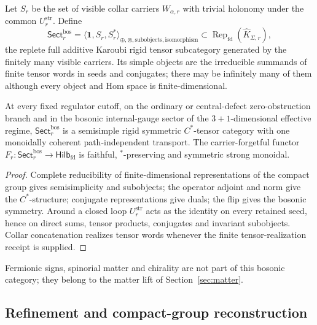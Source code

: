 \documentclass[11pt]{article}
\begin{document}
\begin{definition}
Let \(S_r\) be the set of visible collar carriers \(W_{\alpha,r}\) with trivial
holonomy under the common \(U^{\mathrm{str}}_r\). Define
\[
\mathsf{Sect}^{\mathrm{bos}}_r
=\bigl\langle\mathbf 1,S_r,S_r^*\bigr\rangle_{
\oplus,\otimes,\mathrm{subobjects},\mathrm{isomorphism}}
\subset\operatorname{Rep}_{\mathrm{fd}}(\widehat K_{\Sigma,r}),
\]
the replete full additive Karoubi rigid tensor subcategory generated by the
finitely many visible carriers. Its simple objects are the irreducible
summands of finite tensor words in seeds and conjugates; there may be
infinitely many of them although every object and Hom space is
finite-dimensional.
\end{definition}

\begin{theorem}
At every fixed regulator cutoff, on the ordinary or central-defect
zero-obstruction branch and in the bosonic internal-gauge sector of the
\(3+1\)-dimensional effective regime, \(\mathsf{Sect}^{\mathrm{bos}}_r\) is a
semisimple rigid symmetric \(C^*\)-tensor category with one monoidally
coherent path-independent transport. The carrier-forgetful functor
\(F_r:\mathsf{Sect}^{\mathrm{bos}}_r\to\mathsf{Hilb}_{\mathrm{fd}}\) is
faithful, \(^*\)-preserving and symmetric strong monoidal.
\end{theorem}

\begin{proof}
Complete reducibility of finite-dimensional representations of the compact
group gives semisimplicity and subobjects; the operator adjoint and norm give
the \(C^*\)-structure; conjugate representations give duals; the flip gives
the bosonic symmetry. Around a closed loop \(U^{\mathrm{str}}_r\) acts as the
identity on every retained seed, hence on direct sums, tensor products,
conjugates and invariant subobjects. Collar concatenation realizes tensor
words whenever the finite tensor-realization receipt is supplied.
\end{proof}

Fermionic signs, spinorial matter and chirality are not part of this bosonic
category; they belong to the matter lift of Section~\ref{sec:matter}.

\subsection{Refinement and compact-group reconstruction}
\end{document}
